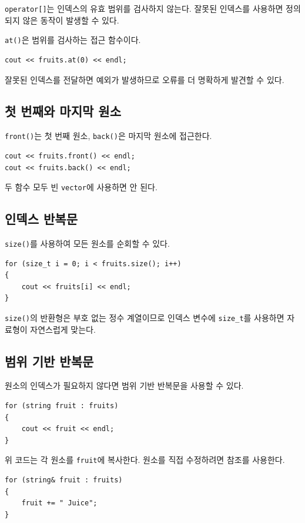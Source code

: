 \documentclass[11pt,a4paper]{article}
\begin{document}
\texttt{operator[]}는 인덱스의 유효 범위를 검사하지 않는다. 잘못된 인덱스를 사용하면 정의되지 않은 동작이 발생할 수 있다.

\texttt{at()}은 범위를 검사하는 접근 함수이다.

\begin{lstlisting}
cout << fruits.at(0) << endl;
\end{lstlisting}

잘못된 인덱스를 전달하면 예외가 발생하므로 오류를 더 명확하게 발견할 수 있다.

\subsection{첫 번째와 마지막 원소}
\texttt{front()}는 첫 번째 원소, \texttt{back()}은 마지막 원소에 접근한다.

\begin{lstlisting}
cout << fruits.front() << endl;
cout << fruits.back() << endl;
\end{lstlisting}

두 함수 모두 빈 \texttt{vector}에 사용하면 안 된다.

\subsection{인덱스 반복문}
\texttt{size()}를 사용하여 모든 원소를 순회할 수 있다.

\begin{lstlisting}
for (size_t i = 0; i < fruits.size(); i++)
{
    cout << fruits[i] << endl;
}
\end{lstlisting}

\texttt{size()}의 반환형은 부호 없는 정수 계열이므로 인덱스 변수에 \texttt{size\_t}를 사용하면 자료형이 자연스럽게 맞는다.

\subsection{범위 기반 반복문}
원소의 인덱스가 필요하지 않다면 범위 기반 반복문을 사용할 수 있다.

\begin{lstlisting}
for (string fruit : fruits)
{
    cout << fruit << endl;
}
\end{lstlisting}

위 코드는 각 원소를 \texttt{fruit}에 복사한다. 원소를 직접 수정하려면 참조를 사용한다.

\begin{lstlisting}
for (string& fruit : fruits)
{
    fruit += " Juice";
}
\end{lstlisting}
\end{document}
